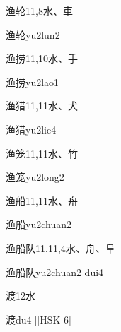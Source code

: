\begin{Entry}{渔轮}{11,8}{⽔、⾞}
  \begin{Phonetics}{渔轮}{yu2lun2}
  \end{Phonetics}
\end{Entry}

\begin{Entry}{渔捞}{11,10}{⽔、⼿}
  \begin{Phonetics}{渔捞}{yu2lao1}
  \end{Phonetics}
\end{Entry}

\begin{Entry}{渔猎}{11,11}{⽔、⽝}
  \begin{Phonetics}{渔猎}{yu2lie4}
  \end{Phonetics}
\end{Entry}

\begin{Entry}{渔笼}{11,11}{⽔、⽵}
  \begin{Phonetics}{渔笼}{yu2long2}
  \end{Phonetics}
\end{Entry}

\begin{Entry}{渔船}{11,11}{⽔、⾈}
  \begin{Phonetics}{渔船}{yu2chuan2}
  \end{Phonetics}
\end{Entry}

\begin{Entry}{渔船队}{11,11,4}{⽔、⾈、⾩}
  \begin{Phonetics}{渔船队}{yu2chuan2 dui4}
  \end{Phonetics}
\end{Entry}

\begin{Entry}{渡}{12}{⽔}
  \begin{Phonetics}{渡}{du4}[][HSK 6]
  \end{Phonetics}
\end{Entry}

